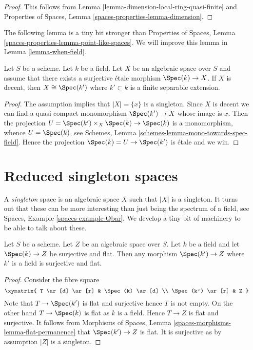 \begin{proof}
This follows from Lemma \ref{lemma-dimension-local-ring-quasi-finite}
and Properties of Spaces, Lemma \ref{spaces-properties-lemma-dimension}.
\end{proof}

\noindent
The following lemma is a tiny bit stronger than
Properties of Spaces,
Lemma \ref{spaces-properties-lemma-point-like-spaces}.
We will improve this lemma in Lemma \ref{lemma-when-field}.

\begin{lemma}
\label{lemma-decent-point-like-spaces}
Let $S$ be a scheme. Let $k$ be a field. Let $X$ be an algebraic space
over $S$ and assume that there exists a surjective \'etale morphism
$\Spec(k) \to X$. If $X$ is decent, then $X \cong \Spec(k')$
where $k' \subset k$ is a finite separable extension.
\end{lemma}

\begin{proof}
The assumption implies that $|X| = \{x\}$ is a singleton. Since
$X$ is decent we can find a quasi-compact monomorphism $\Spec(k') \to X$
whose image is $x$. Then the projection
$U = \Spec(k') \times_X \Spec(k) \to \Spec(k)$
is a monomorphism, whence $U = \Spec(k)$, see
Schemes, Lemma \ref{schemes-lemma-mono-towards-spec-field}.
Hence the projection $\Spec(k) = U \to \Spec(k')$ is \'etale and
we win.
\end{proof}






\section{Reduced singleton spaces}
\label{section-singleton}

\noindent
A {\it singleton} space is an algebraic space $X$ such that $|X|$ is
a singleton. It turns out that these can be more interesting than
just being the spectrum of a field, see
Spaces, Example \ref{spaces-example-Qbar}.
We develop a tiny bit of machinery to be able to talk about these.

\begin{lemma}
\label{lemma-flat-cover-by-field}
Let $S$ be a scheme. Let $Z$ be an algebraic space over $S$.
Let $k$ be a field and let $\Spec(k) \to Z$ be surjective and flat.
Then any morphism $\Spec(k') \to Z$ where $k'$ is a field is
surjective and flat.
\end{lemma}

\begin{proof}
Consider the fibre square
$$
\xymatrix{
T \ar[d] \ar[r] & \Spec(k) \ar[d] \\
\Spec(k') \ar[r] & Z
}
$$
Note that $T \to \Spec(k')$ is flat and surjective hence $T$
is not empty. On the other hand $T \to \Spec(k)$ is flat as
$k$ is a field. Hence $T \to Z$ is flat and surjective.
It follows from
Morphisms of Spaces, Lemma \ref{spaces-morphisms-lemma-flat-permanence}
that $\Spec(k') \to Z$ is flat. It is surjective as by assumption
$|Z|$ is a singleton.
\end{proof}

